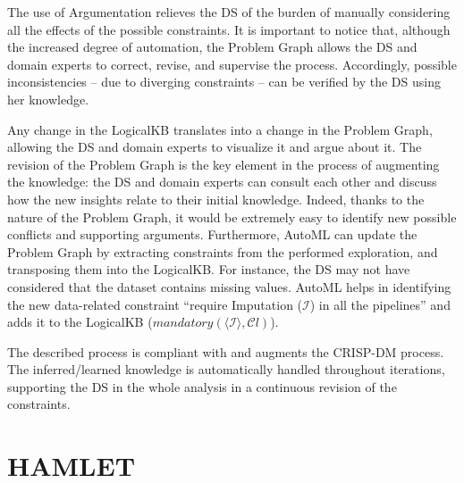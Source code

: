 \documentclass[5p,times]{elsarticle}
\begin{document}
The use of Argumentation relieves the DS of the burden of manually considering all the effects of the possible constraints.
It is important to notice that, although the increased degree of automation, the Problem Graph allows the DS and domain experts to correct, revise, and supervise the process.
Accordingly, possible inconsistencies -- due to diverging constraints -- can be verified by the DS using her knowledge.

Any change in the LogicalKB translates into a change in the Problem Graph, allowing the DS and domain experts to visualize it and argue about it.
The revision of the Problem Graph is the key element in the process of augmenting the knowledge: the DS and domain experts can consult each other and discuss how the new insights relate to their initial knowledge.
Indeed, thanks to the nature of the Problem Graph, it would be extremely easy to identify new possible conflicts and supporting arguments.
Furthermore, AutoML can update the Problem Graph by extracting constraints from the performed exploration, and transposing them into the LogicalKB.
For instance, the DS may not have considered that the dataset contains missing values.
AutoML helps in identifying the new data-related constraint ``require Imputation ($\mathcal{I}$) in all the pipelines'' and adds it to the LogicalKB ($mandatory(\langle \mathcal{I} \rangle, \mathcal{C}l)$).

The described process is compliant with and augments the CRISP-DM process.
The inferred/learned knowledge is automatically handled throughout iterations, supporting the DS in the whole analysis in a continuous revision of the constraints.
\vspace{2cm}
\section{HAMLET}\label{sec:implementation}
\end{document}
